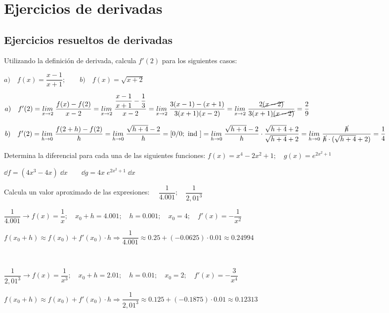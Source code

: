 			\section{Ejercicios de derivadas}
	\subsection{Ejercicios resueltos de derivadas}
	
	\begin{ejre} Utilizando la definición de derivada, calcula $f'(2)$ para los siguientes casos:
	
	$a) \quad f(x)=\dfrac {x-1}{x+1}; \qquad b) \quad f(x)=\sqrt{x+2}$
	\end{ejre}
	
	\begin{proofw}\renewcommand{\qedsymbol}{$\diamond$}
	
	$a) \quad f'(2)=\underset{x\to 2}{lim}\;{\dfrac {f(x)-f(2)}{x-2}}= \underset{x\to 2}{lim}\; {\dfrac {\dfrac {x-1}{x+1}-\dfrac 1 3}{x-2}}=\underset{x\to 2}{lim}\; {\dfrac {3(x-1)-(x+1)}{3(x+1)(x-2)}}=\underset{x\to 2}{lim}\; {\dfrac {2\cancel{(x-2)}}{3(x+1)\cancel{(x-2)}}}=\dfrac 2 9$
	
	$b) \quad f'(2)=\underset{h\to 0}{lim}\;{\dfrac {f(2+h)-f(2)}{h}}=\underset{h\to 0}{lim}\;{\dfrac {\sqrt{h+4}-2}{h}}=[0/0;\mbox{ ind }]= \underset{h\to 0}{lim}\;{\dfrac {\sqrt{h+4}-2}{h}}\cdot \dfrac {\sqrt{h+4}+2}{\sqrt{h+4}+2}=\underset{h\to 0}{lim}\;{\dfrac {\cancel{h}}{\cancel{h}\cdot(\sqrt{h+4}+2) }}=\dfrac 1 4$
	
	\end{proofw}
	
	\begin{ejre} Determina la diferencial para cada una de las siguientes funciones: $f(x)=x^4-2x^2+1;\quad g(x)=e^{2x^2+1}$	
	\end{ejre}
	
	\begin{proofw}\renewcommand{\qedsymbol}{$\diamond$}
	
	$\dd f= (4x^3-4x)\; \dd x \qquad \dd g= 4x\; e^{2x^2+1}\; \dd x$
	\end{proofw}
	
	\begin{ejre} Calcula un valor aproximado de las expresiones: $\quad \dfrac 1 {4.001}; \quad \dfrac {1}{2,01^3}$	
	\end{ejre}
	
	\begin{proofw}\renewcommand{\qedsymbol}{$\diamond$}
	
	$\dfrac 1 {4.001} \to f(x)=\dfrac 1 x;\quad x_0+h=4.001;\quad h=0.001; \quad x_0=4; \quad f'(x)=-\dfrac 1 {x^2}$
	
	$f(x_0+h) \approx f(x_0)+f'(x_0) \cdot h \Rightarrow \dfrac 1 {4.001} \approx 0.25 + (-0.0625)\cdot 0.01 \approx 0.24994$
	
	$\quad$
	
	$\dfrac {1}{2,01^3} \to f(x)=\dfrac 1 {x^3};\quad x_0+h=2.01;\quad h=0.01; \quad x_0=2; \quad f'(x)=-\dfrac 3 {x^4}$
	
	$f(x_0+h) \approx f(x_0)+f'(x_0) \cdot h \Rightarrow \dfrac 1 {2,01^3} \approx 0.125 + (-0.1875)\cdot 0.01 \approx 0.12313$
	\end{proofw}

